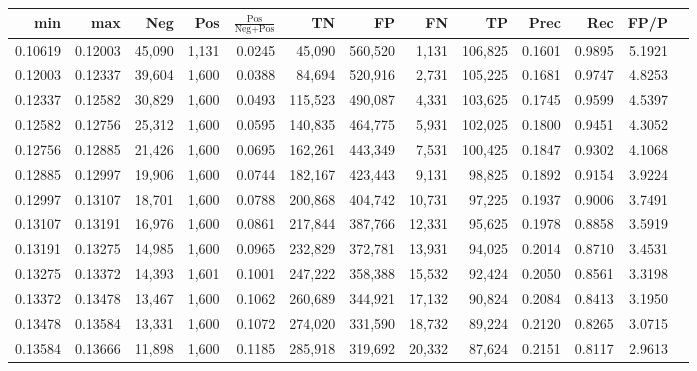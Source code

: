 \begin{tabular}{rrrrrrrrrrrrr}
\toprule
    min &     max &    Neg &   Pos & $\frac{\text{Pos}}{\text{Neg}+\text{Pos}}$ &      TN &      FP &      FN &      TP &   Prec &    Rec &   FP/P \\
\midrule
0.10619 & 0.12003 & 45,090 & 1,131 &                                     0.0245 &  45,090 & 560,520 &   1,131 & 106,825 & 0.1601 & 0.9895 & 5.1921 \\
0.12003 & 0.12337 & 39,604 & 1,600 &                                     0.0388 &  84,694 & 520,916 &   2,731 & 105,225 & 0.1681 & 0.9747 & 4.8253 \\
0.12337 & 0.12582 & 30,829 & 1,600 &                                     0.0493 & 115,523 & 490,087 &   4,331 & 103,625 & 0.1745 & 0.9599 & 4.5397 \\
0.12582 & 0.12756 & 25,312 & 1,600 &                                     0.0595 & 140,835 & 464,775 &   5,931 & 102,025 & 0.1800 & 0.9451 & 4.3052 \\
0.12756 & 0.12885 & 21,426 & 1,600 &                                     0.0695 & 162,261 & 443,349 &   7,531 & 100,425 & 0.1847 & 0.9302 & 4.1068 \\
0.12885 & 0.12997 & 19,906 & 1,600 &                                     0.0744 & 182,167 & 423,443 &   9,131 &  98,825 & 0.1892 & 0.9154 & 3.9224 \\
0.12997 & 0.13107 & 18,701 & 1,600 &                                     0.0788 & 200,868 & 404,742 &  10,731 &  97,225 & 0.1937 & 0.9006 & 3.7491 \\
0.13107 & 0.13191 & 16,976 & 1,600 &                                     0.0861 & 217,844 & 387,766 &  12,331 &  95,625 & 0.1978 & 0.8858 & 3.5919 \\
0.13191 & 0.13275 & 14,985 & 1,600 &                                     0.0965 & 232,829 & 372,781 &  13,931 &  94,025 & 0.2014 & 0.8710 & 3.4531 \\
0.13275 & 0.13372 & 14,393 & 1,601 &                                     0.1001 & 247,222 & 358,388 &  15,532 &  92,424 & 0.2050 & 0.8561 & 3.3198 \\
0.13372 & 0.13478 & 13,467 & 1,600 &                                     0.1062 & 260,689 & 344,921 &  17,132 &  90,824 & 0.2084 & 0.8413 & 3.1950 \\
0.13478 & 0.13584 & 13,331 & 1,600 &                                     0.1072 & 274,020 & 331,590 &  18,732 &  89,224 & 0.2120 & 0.8265 & 3.0715 \\
0.13584 & 0.13666 & 11,898 & 1,600 &                                     0.1185 & 285,918 & 319,692 &  20,332 &  87,624 & 0.2151 & 0.8117 & 2.9613 \\

\end{tabular}
